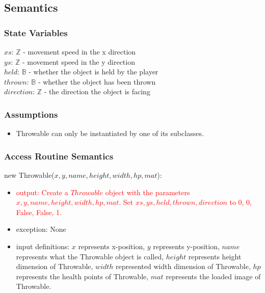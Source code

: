 \documentclass[12pt]{article}
\newcommand{\m}[1]{\mbox{#1}}
\begin{document}
\subsection*{Semantics}

\subsubsection*{State Variables}

$xs$: $\mathbb{Z}$ - movement speed in the x direction\\
$ys$: $\mathbb{Z}$ - movement speed in the y direction\\
$held$: $\mathbb{B}$ - whether the object is held by the player\\
$thrown$: $\mathbb{B}$ - whether the object has been thrown\\
$direction$: $\mathbb{Z}$ - the direction the object is facing

\subsubsection*{Assumptions}

\begin{itemize}
    \item Throwable can only be instantiated by one of its subclasses.
\end{itemize}

\subsubsection*{Access Routine Semantics}

new Throwable($x, y, name, height, width, hp, mat$):
\begin{itemize}
    \item \textcolor{red}{output: Create a $Throwable$ object with the parameters $x, y, name, height, width, hp, mat$. Set $xs, ys, held, thrown, direction$ to 0, 0, False, False, 1.}
    \item exception: None
    \item input definitions: $x$ represents x-position, $y$ represents y-position, $name$ represents what the Throwable object is called, $height$ represents height dimension of Throwable, $width$ represented width dimension of Throwable, $hp$ represents the health points of Throwable, $mat$ represents the loaded image of Throwable.
\end{itemize}
\end{document}
